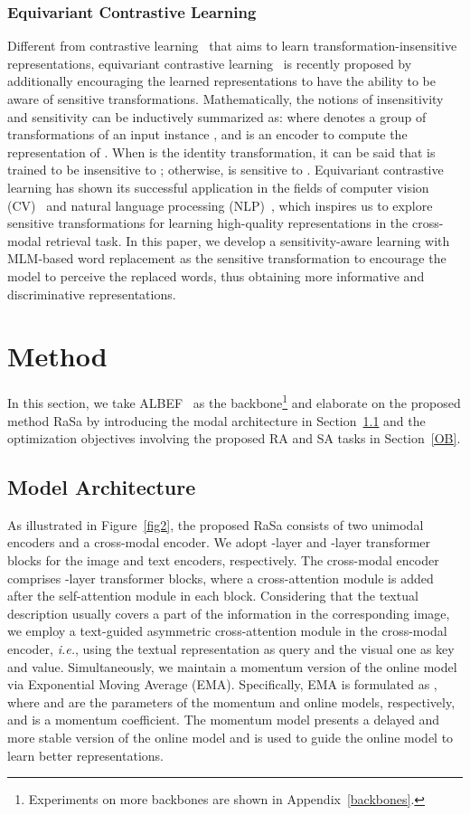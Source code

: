 \documentclass{article}
\begin{document}
\subsubsection{Equivariant Contrastive Learning}
Different from contrastive learning~\cite{he2020momentum} that aims to learn transformation-insensitive representations, equivariant contrastive learning~\cite{dangovski2022equivariant} is recently proposed by additionally encouraging the learned representations to have the ability to be aware of sensitive transformations.
Mathematically, the notions of insensitivity and sensitivity can be inductively summarized as:  where  denotes a group of transformations of an input instance , and  is an encoder to compute the representation of .
When  is the identity transformation, it can be said that  is trained to be insensitive to ; otherwise,  is sensitive to .
Equivariant contrastive learning has shown its successful application in the fields of computer vision (CV)~\cite{dangovski2022equivariant} and natural language processing (NLP)~\cite{chuang2022diffcse}, which inspires us to explore sensitive transformations for learning high-quality representations in the cross-modal retrieval task.
In this paper, we develop a sensitivity-aware learning with MLM-based word replacement as the sensitive transformation to encourage the model to perceive the replaced words, thus obtaining more informative and discriminative representations.


\section{Method}
In this section, we take ALBEF~\cite{NEURIPS2021_50525975} as the backbone\footnote{Experiments on more backbones are shown in Appendix~\ref{backbones}.} and elaborate on the proposed method RaSa by introducing the modal architecture in Section~\ref{MA} and the optimization objectives involving the proposed RA and SA tasks in Section~\ref{OB}.

\subsection{Model Architecture}
\label{MA}
As illustrated in Figure~\ref{fig2}, the proposed RaSa consists of two unimodal encoders and a cross-modal encoder.
We adopt -layer and -layer transformer blocks for the image and text encoders, respectively.
The cross-modal encoder comprises -layer transformer blocks, where a cross-attention module is added after the self-attention module in each block.
Considering that the textual description usually covers a part of the information in the corresponding image, we employ a text-guided asymmetric cross-attention module in the cross-modal encoder, \emph{i.e.}, using the textual representation as query and the visual one as key and value.
Simultaneously, we maintain a momentum version of the online model via Exponential Moving Average (EMA).
Specifically, EMA is formulated as , where  and  are the parameters of the momentum and online models, respectively, and  is a momentum coefficient.
The momentum model presents a delayed and more stable version of the online model and is used to guide the online model to learn better representations. 
\end{document}
